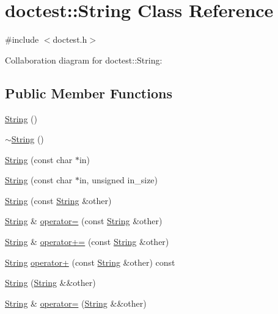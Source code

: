 \hypertarget{classdoctest_1_1_string}{}\section{doctest\+:\+:String Class Reference}
\label{classdoctest_1_1_string}


{\ttfamily \#include $<$doctest.\+h$>$}



Collaboration diagram for doctest\+:\+:String\+:
\subsection*{Public Member Functions}
\begin{DoxyCompactItemize}
\item 
\hyperlink{classdoctest_1_1_string_ab18d26f6c9e728c2fac77a501b8ca5f5}{String} ()
\item 
\hyperlink{classdoctest_1_1_string_af5dce5deeb8f25a4866efdff75e92975}{$\sim$\+String} ()
\item 
\hyperlink{classdoctest_1_1_string_abb4449cbc613cd973ae774c704fca5dd}{String} (const char $\ast$in)
\item 
\hyperlink{classdoctest_1_1_string_a01d9f84ab0a3dc67b195678b6073dd4c}{String} (const char $\ast$in, unsigned in\+\_\+size)
\item 
\hyperlink{classdoctest_1_1_string_a27ca7976da20bdebbf225fa496c38ad1}{String} (const \hyperlink{classdoctest_1_1_string}{String} \&other)
\item 
\hyperlink{classdoctest_1_1_string}{String} \& \hyperlink{classdoctest_1_1_string_a1979700c536cfe9b5fecc328245f74ca}{operator=} (const \hyperlink{classdoctest_1_1_string}{String} \&other)
\item 
\hyperlink{classdoctest_1_1_string}{String} \& \hyperlink{classdoctest_1_1_string_ad1df797f12cd140e3d1739f2b30b64d2}{operator+=} (const \hyperlink{classdoctest_1_1_string}{String} \&other)
\item 
\hyperlink{classdoctest_1_1_string}{String} \hyperlink{classdoctest_1_1_string_a6ddb6cf1b744a0ae1d4e26b3c8dfa827}{operator+} (const \hyperlink{classdoctest_1_1_string}{String} \&other) const
\item 
\hyperlink{classdoctest_1_1_string_a4bbdcb36cd68988953c3bb2d18e53210}{String} (\hyperlink{classdoctest_1_1_string}{String} \&\&other)
\item 
\hyperlink{classdoctest_1_1_string}{String} \& \hyperlink{classdoctest_1_1_string_a6099dbedeb150eb5659c7aa5dcea1727}{operator=} (\hyperlink{classdoctest_1_1_string}{String} \&\&other)

\end{DoxyCompactItemize}
